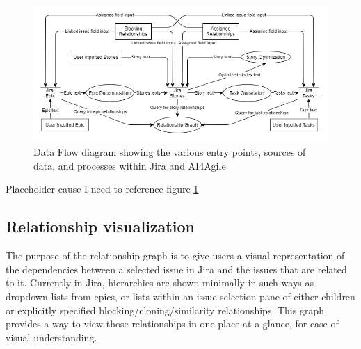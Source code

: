 \begin{figure}
\centerline{\includegraphics[width=\textwidth,height=\textheight,keepaspectratio]{./figure/DataflowDiagram.png}}
\caption{Data Flow diagram showing the various entry points, sources of data, and processes within Jira and AI4Agile}
\label{fig:DataFlowDiagram}
\end{figure}
Placeholder cause I need to reference figure \ref{fig:DataFlowDiagram}
\subsection{Relationship visualization}
The purpose of the relationship graph is to give users a visual representation of the dependencies between a selected issue in Jira and the issues that are related to it. Currently in Jira, hierarchies are shown minimally in such ways as dropdown lists from epics, or lists within an issue selection pane of either children or explicitly specified blocking/cloning/similarity relationships. This graph provides a way to view those relationships in one place at a glance, for ease of visual understanding.
